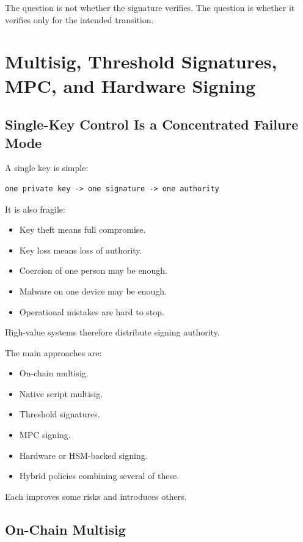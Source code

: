 The question is not whether the signature verifies. The question is
whether it verifies only for the intended transition.

\section{Multisig, Threshold Signatures, MPC, and Hardware Signing}

\subsection{Single-Key Control Is a Concentrated Failure Mode}

A single key is simple:

\begin{lstlisting}
one private key -> one signature -> one authority
\end{lstlisting}

It is also fragile:

\begin{itemize}
\tightlist
\item
  Key theft means full compromise.
\item
  Key loss means loss of authority.
\item
  Coercion of one person may be enough.
\item
  Malware on one device may be enough.
\item
  Operational mistakes are hard to stop.
\end{itemize}

High-value systems therefore distribute signing authority.

The main approaches are:

\begin{itemize}
\tightlist
\item
  On-chain multisig.
\item
  Native script multisig.
\item
  Threshold signatures.
\item
  MPC signing.
\item
  Hardware or HSM-backed signing.
\item
  Hybrid policies combining several of these.
\end{itemize}

Each improves some risks and introduces others.

\subsection{On-Chain Multisig}

